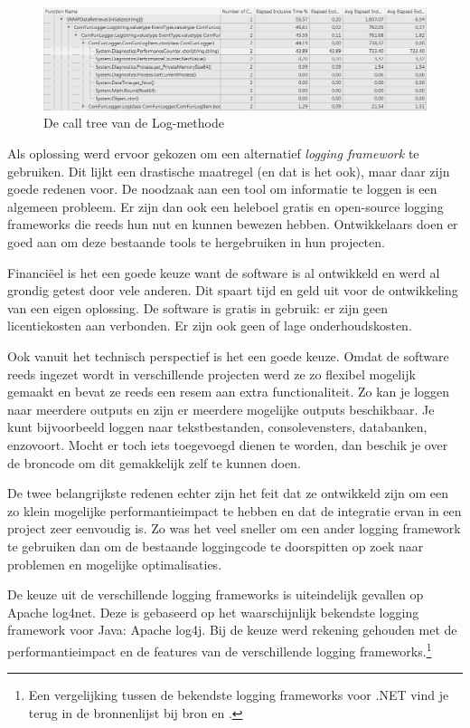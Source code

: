 \begin{figure}[h]
	\centering
	\includegraphics[scale=0.50]{figures/profiler/call-tree-performancecounter}
	\caption{De call tree van de Log-methode}
	\label{call-tree-performancecounter}
\end{figure}


Als oplossing werd ervoor gekozen om een alternatief \emph{logging framework} te gebruiken.
Dit lijkt een drastische maatregel (en dat is het ook), maar daar zijn goede redenen voor.
De noodzaak aan een tool om informatie te loggen is een algemeen probleem.
Er zijn dan ook een heleboel gratis en open-source logging frameworks die reeds hun nut en kunnen bewezen hebben.
Ontwikkelaars doen er goed aan om deze bestaande tools te hergebruiken in hun projecten.

Financiëel is het een goede keuze want de software is al ontwikkeld en werd al grondig getest door vele anderen.
Dit spaart tijd en geld uit voor de ontwikkeling van een eigen oplossing.
De software is gratis in gebruik: er zijn geen licentiekosten aan verbonden.
Er zijn ook geen of lage onderhoudskosten.

Ook vanuit het technisch perspectief is het een goede keuze.
Omdat de software reeds ingezet wordt in verschillende projecten werd ze zo flexibel mogelijk gemaakt en bevat ze reeds een resem aan extra functionaliteit.
Zo kan je loggen naar meerdere outputs en zijn er meerdere mogelijke outputs beschikbaar.
Je kunt bijvoorbeeld loggen naar tekstbestanden, consolevensters, databanken, enzovoort.
Mocht er toch iets toegevoegd dienen te worden, dan beschik je over de broncode om dit gemakkelijk zelf te kunnen doen.

De twee belangrijkste redenen echter zijn het feit dat ze ontwikkeld zijn om een zo klein mogelijke performantieimpact te hebben en
dat de integratie ervan in een project zeer eenvoudig is.
Zo was het veel sneller om een ander logging framework te gebruiken dan om de bestaande loggingcode te doorspitten op zoek naar problemen en mogelijke optimalisaties.

De keuze uit de verschillende logging frameworks is uiteindelijk gevallen op Apache log4net.
Deze is gebaseerd op het waarschijnlijk bekendste logging framework voor Java: Apache log4j.
Bij de keuze werd rekening gehouden met de performantieimpact en de features van de verschillende logging frameworks.\footnote{
	Een vergelijking tussen de bekendste logging frameworks voor .NET vind je 
	terug in de bronnenlijst bij bron \cite{logging-frameworks-and-performance} en \cite{logging-frameworks}.
}

